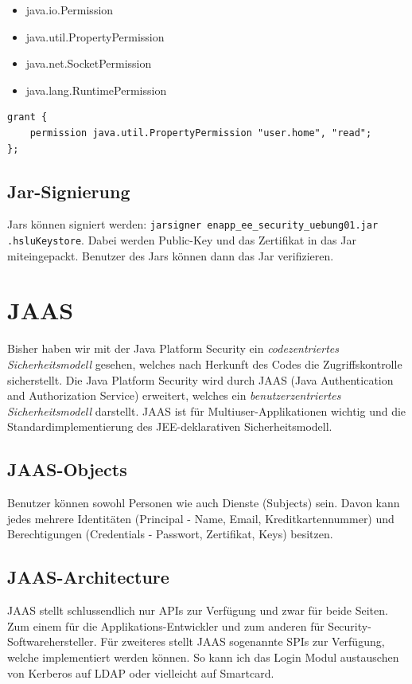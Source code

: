 \begin{multicols}{2}
\begin{itemize}
	\item java.io.Permission
	\item java.util.PropertyPermission
	\item java.net.SocketPermission
	\item java.lang.RuntimePermission
\end{itemize}
\end{multicols}

\begin{lstlisting}
grant {
	permission java.util.PropertyPermission "user.home", "read";
};
\end{lstlisting}

\subsection{Jar-Signierung}
Jars können signiert werden: \verb|jarsigner enapp_ee_security_uebung01.jar .hsluKeystore|. Dabei werden Public-Key und das Zertifikat in das Jar miteingepackt. Benutzer des Jars können dann das Jar verifizieren.


\section{JAAS}
Bisher haben wir mit der Java Platform Security ein \emph{codezentriertes Sicherheitsmodell} gesehen, welches nach Herkunft des Codes die Zugriffskontrolle sicherstellt. Die Java Platform Security wird durch JAAS (Java Authentication and Authorization Service) erweitert, welches ein \emph{benutzerzentriertes Sicherheitsmodell} darstellt. JAAS ist für Multiuser-Applikationen wichtig und die Standardimplementierung des JEE-deklarativen Sicherheitsmodell.

\subsection{JAAS-Objects}
Benutzer können sowohl Personen wie auch Dienste (Subjects) sein. Davon kann jedes mehrere Identitäten (Principal - Name, Email, Kreditkartennummer) und Berechtigungen (Credentials - Passwort, Zertifikat, Keys) besitzen. 

\subsection{JAAS-Architecture}
JAAS stellt schlussendlich nur APIs zur Verfügung und zwar für beide Seiten. Zum einem für die Applikations-Entwickler und zum anderen für Security-Softwarehersteller. Für zweiteres stellt JAAS sogenannte SPIs zur Verfügung, welche implementiert werden können. So kann ich das Login Modul austauschen von Kerberos auf LDAP oder vielleicht auf Smartcard.





